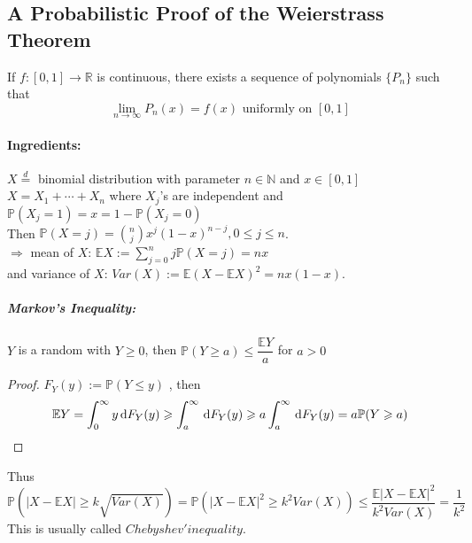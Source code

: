 \subsection{A Probabilistic Proof of the Weierstrass Theorem}
\begin{theorem}
    If  $ f :[0,1]\rightarrow\mathbb{R} $ is continuous, there exists a sequence of polynomials $ \{P_n \} $ such that 
    \[\lim\limits_{n\to\infty } P_n (x)=f(x) \text{ uniformly on }[0,1] \]
\end{theorem}
\paragraph{Ingredients:} $ X\overset{d }{=} $ binomial distribution with parameter  $ n\in \mathbb{N } $ and  $ x\in[0,1] $\\
 $ X=X_1+\cdots+X_n  $ where  $ X_j $'s are independent and  $ \mathbb{P}(X_j=1)=x=1-\mathbb{P}(X_j=0) $\\
 Then  $ \mathbb{P}(X=j)=\binom{n }{j } x^j(1-x)^{n-j},0 \leqslant j \leqslant n  $.\\
  $ \Rightarrow  $ mean of  $ X  $:  $ \mathbb{E}X:=\sum\limits_{j=0}^{n}j\mathbb{P}(X=j)=nx  $ \\and variance of  $ X  $:  $ Var(X):=\mathbb{E}(X-\mathbb{E}X)^2=nx(1-x) $.\\
\subparagraph{Markov's Inequality:}  $ Y  $ is a random with  $ Y\geqslant 0  $, then  $ \mathbb{P}(Y\geqslant a) \leqslant \dfrac{\mathbb{E}Y }{a} $ for  $ a>0 $
\begin{proof}
     $ F_Y(y):=\mathbb{P}(Y \leqslant y) $ , then  
      \[\mathbb{E}Y=\int_{0 }^{\infty} y\, \mathrm{d}F_Y(y)\geqslant \int_{a}^{\infty} \, \mathrm{d}F_Y(y)\geqslant a \int_{a}^{\infty} \, \mathrm{d}F_Y(y)=a\mathbb{P}(Y\geqslant a)\qedhere  \]
\end{proof}   
Thus  \[\mathbb{P}(|X-\mathbb{E}X|\geqslant k\sqrt{Var(X)})=\mathbb{P}(|X-\mathbb{E}X|^2\geqslant k^2Var(X)) \leqslant \dfrac{\mathbb{E}|X-\mathbb{E}X|^2}{k^2Var(X)}=\dfrac{1 }{k^2} \]
This is usually called  $ Chebyshev'inequality $.
